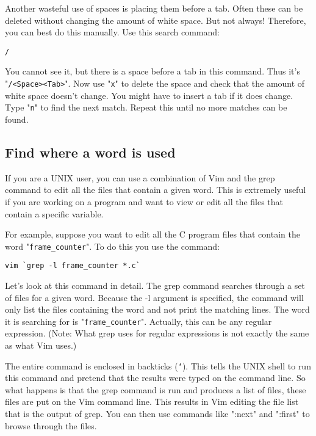Another wasteful use of spaces is placing them before a tab.
Often these can be deleted without changing the amount of white space.
But not always!  Therefore, you can best do this manually.
Use this search command:

\begin{Verbatim}[samepage=true]
 /   
\end{Verbatim}

You cannot see it, but there is a space before a tab in this command.
Thus it's "\texttt{/<Space><Tab>}".
Now use "\texttt{x}" to delete the space and check that the amount of white space doesn't change.
You might have to insert a tab if it does change.
Type "\texttt{n}" to find the next match.
Repeat this until no more matches can be found.
\subsection{Find where a word is used}
If you are a UNIX user, you can use a combination of Vim and the grep command to edit all the files that contain a given word.
This is extremely useful if you are working on a program and want to view or edit all the files that contain a specific variable.

For example, suppose you want to edit all the C program files that contain the word "\texttt{frame\_counter}".
To do this you use the command:

\begin{Verbatim}[samepage=true]
 vim `grep -l frame_counter *.c`
\end{Verbatim}

Let's look at this command in detail.
The grep command searches through a set of files for a given word.
Because the -l argument is specified, the command will only list the files containing the word and not print the matching lines.
The word it is searching for is "\texttt{frame\_counter}".
Actually, this can be any regular expression.
(Note: What grep uses for regular expressions is not exactly the same as what Vim uses.)

The entire command is enclosed in backticks (\texttt{`}).
This tells the UNIX shell to run this command and pretend that the results were typed on the command line.
So what happens is that the grep command is run and produces a list of files, these files are put on the Vim command line.
This results in Vim editing the file list that is the output of grep.
You can then use commands like ":next" and ":first" to browse through the files.

